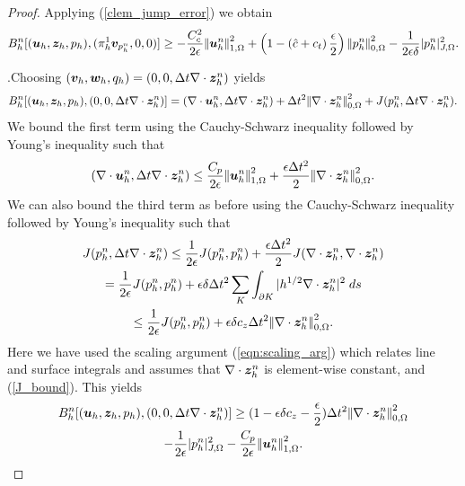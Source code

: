\begin{proof}
Applying (\ref{clem_jump_error}) we obtain
\begin{multline}
 B_{h}^{n}[(\boldsymbol{u}_{h},\boldsymbol{z}_{h},p_h),(\pi_{h}^{1} {\boldsymbol{v}_{p_h^n}},0,0)] \geq  -\frac{C_{c}^{2}}{2\epsilon} {\left\vert\kern-0.25ex\left\vert \boldsymbol{u}_{h}^{n} \right\vert\kern-0.25ex\right\vert}_{1,\Omega}^{2}+ \left(1-\left(\hat{c}+{c_{t}}\right) \frac{\epsilon}{2}\right) {\left\vert\kern-0.25ex\left\vert p_{h}^{n} \right\vert\kern-0.25ex\right\vert}_{0,\Omega}^{2} -  \frac{1}{2 \epsilon \delta} |{p_{h}^{n}}|_{J,\Omega}^{2}.
    \label{ltwopbound}
\end{multline} \newline

.\newline  Choosing $(\boldsymbol{v}_{h},\boldsymbol{w}_{h},{q}_{h})=(0,0,\Delta t \nabla \cdot \boldsymbol{z}_{h}^{n})$ yields
\begin{equation*}
  B_{h}^{n}[(\boldsymbol{u}_{h},\boldsymbol{z}_{h},p_h),(0,0,\Delta t\nabla \cdot \boldsymbol{z}_{h}^{n})]= (\nabla \cdot\boldsymbol{u}_{h}^{n},\Delta t\nabla \cdot \boldsymbol{z}_{h}^{n}) + \Delta t^{2}{\left\vert\kern-0.25ex\left\vert \nabla \cdot \boldsymbol{z}_{h}^{n} \right\vert\kern-0.25ex\right\vert}_{0,\Omega}^{2} + J(p_{h}^{n},\Delta t\nabla \cdot \boldsymbol{z}_{h}^{n}).
\end{equation*}
We bound the first term using the Cauchy-Schwarz inequality followed by Young's inequality such that
\begin{equation*}
(\nabla \cdot\boldsymbol{u}_{h}^{n},\Delta t\nabla \cdot \boldsymbol{z}_{h}^{n}) \leq \frac{C_{p}}{2\epsilon}{\left\vert\kern-0.25ex\left\vert \boldsymbol{u}_{h}^{n} \right\vert\kern-0.25ex\right\vert}_{1,\Omega}^{2}+ \frac{\epsilon\Delta t^{2}}{2}{\left\vert\kern-0.25ex\left\vert \nabla \cdot \boldsymbol{z}_{h}^{n} \right\vert\kern-0.25ex\right\vert}_{0,\Omega}^{2}.
\end{equation*}
We can also bound the third term as before using the Cauchy-Schwarz inequality followed by Young's inequality such that
\begin{multline}
J(p_{h}^{n},\Delta t\nabla \cdot \boldsymbol{z}_{h}^{n}) \leq \frac{1}{2\epsilon}J(p_{h}^{n},p_{h}^{n}) + \frac{\epsilon\Delta t^{2}}{2}J(\nabla \cdot \boldsymbol{z}_{h}^{n},\nabla \cdot \boldsymbol{z}_{h}^{n}) \\
= \frac{1}{2\epsilon}J(p_{h}^{n},p_{h}^{n}) + {\epsilon \delta \Delta t^{2}}\sum_{K} \int_{\partial K }  |h^{1/2}\nabla \cdot \boldsymbol{z}_{h}^{n}|^{2} \;ds \\ \leq \frac{1}{2 \epsilon}J(p_{h}^{n},p_{h}^{n}) + {\epsilon \delta c_{z}  \Delta t^{2}}{\left\vert\kern-0.25ex\left\vert \nabla \cdot \boldsymbol{z}_{h}^{n} \right\vert\kern-0.25ex\right\vert}_{0,\Omega}^{2}.
\label{eqn:J_pdivzbound}
\end{multline}
Here we have used the scaling argument (\ref{eqn:scaling_arg}) which relates line and surface integrals and assumes that ${\nabla\cdot\boldsymbol{z}_{h}^{n}}$ is element-wise constant, and (\ref{J_bound}). This yields
\begin{multline}
  B_{h}^{n}[(\boldsymbol{u}_{h},\boldsymbol{z}_{h},p_h),(0,0, \Delta t \nabla \cdot \boldsymbol{z}_{h}^{n})] \geq (1-{\epsilon\delta c_{z}}-\frac{\epsilon}{2})\Delta t^{2}{\left\vert\kern-0.25ex\left\vert \nabla \cdot \boldsymbol{z}_{h}^{n} \right\vert\kern-0.25ex\right\vert}_{0,\Omega}^{2} \\-\frac{1}{2 \epsilon }|{p_{h}^{n}}|_{J,\Omega}^{2}-\frac{C_{p}}{2 \epsilon }{\left\vert\kern-0.25ex\left\vert \boldsymbol{u}_{h}^{n} \right\vert\kern-0.25ex\right\vert}_{1,\Omega}^{2}.
  \label{divfluxbound}
\end{multline} \newline



\end{proof}
